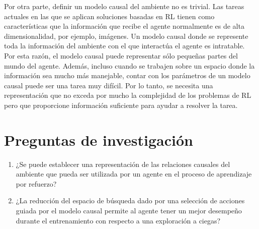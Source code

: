Por otra parte, definir un modelo causal del ambiente no es trivial.
Las tareas actuales en las que se aplican soluciones 
basadas en RL tienen como características que la información
que recibe el agente normalmente es de alta dimensionalidad, por 
ejemplo, imágenes. Un modelo causal donde se represente toda
la información del ambiente con el que interactúa el agente
es intratable. 
Por esta razón, el modelo causal puede representar sólo pequeñas partes del mundo del agente. Además, incluso cuando se trabajen sobre un espacio donde la información sea 
mucho más manejable, contar con los parámetros de un modelo causal puede ser una tarea muy difícil. Por lo tanto, se necesita una representación que no exceda por mucho la complejidad de los problemas de RL pero que proporcione información suficiente para ayudar a resolver la tarea.








\section{Preguntas de investigación}

\begin{enumerate}
    \item ¿Se puede establecer una representación de las relaciones causales
del ambiente que pueda ser utilizada por un agente en el proceso
de aprendizaje por refuerzo?
    \item ¿La reducción del espacio de búsqueda dado por una selección de acciones guiada por el modelo causal permite al agente tener un mejor desempeño durante el entrenamiento con respecto a una exploración a ciegas?
\end{enumerate}
